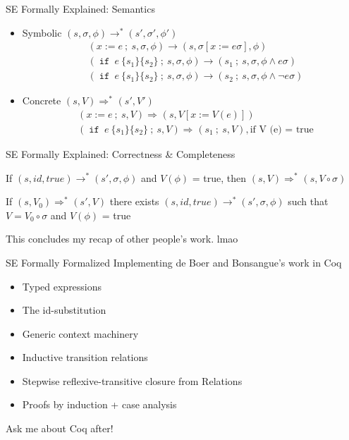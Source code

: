\documentclass{beamer}
\renewcommand{\note}[1]{{\color{orange}#1}}
\DeclareMathOperator{\ifs}{\mathtt{if}}
\begin{document}
\newcommand{\Sstep}[2]{\ensuremath{#1 \rightarrow #2}}
\newcommand{\Sstar}[2]{\ensuremath{#1 \rightarrow^{*} #2}}
\newcommand{\Cstep}[3][]{\ensuremath{#2 \bm{\Rightarrow}_{#1} #3}}
\newcommand{\Cstar}[3][]{\ensuremath{#2 \bm{\Rightarrow^{*}}_{#1} #3}}

\begin{frame}{SE Formally Explained: Semantics}
  \begin{itemize}
    \item Symbolic $\Sstar{(s, \sigma, \phi)}{(s', \sigma', \phi')}$
          \begin{align*}
            &\Sstep{(x := e~;~s, \sigma, \phi)}{(s, \sigma[x := e\sigma], \phi)}\\
            &\Sstep{(\ifs~e~\{s_{1}\}\{s_{2}\}~;~s, \sigma, \phi)}{(s_{1}~;~s, \sigma, \phi \land e\sigma)}\\
            &\Sstep{(\ifs~e~\{s_{1}\}\{s_{2}\}~;~s, \sigma, \phi)}{(s_{2}~;~s, \sigma, \phi \land \neg e\sigma)}
          \end{align*}
    \item Concrete $\Cstar{(s, V)}{(s', V')}$
          \begin{align*}
            &\Cstep{(x := e~;~s, V)}{(s, V[x := V(e)])}\\
            &\Cstep{(\ifs~e~\{s_{1}\}\{s_{2}\}~;~s, V)}{(s_{1}~;~s, V)}, \text{if V (e) = true}
          \end{align*}
  \end{itemize}
\end{frame}

\begin{frame}{SE Formally Explained: Correctness \& Completeness}
  \begin{theorem}[Correctness]
    If $\Sstar{(s, id, true)}{(s', \sigma, \phi)}$ and $V(\phi)$ = true, then $\Cstar{(s, V)}{(s, V \circ \sigma)}$
  \end{theorem}
  \vfill
  \begin{theorem}[Completeness]
    If $\Cstar{(s, V_{0})}{(s', V)}$ there exists $\Sstar{(s, id, true)}{(s', \sigma, \phi)}$ such that $V = V_{0} \circ \sigma$ and $V(\phi)$ = true
  \end{theorem}
  \note{This concludes my recap of other people's work. lmao}
\end{frame}

\begin{frame}{SE Formally Formalized}
  Implementing de Boer and Bonsangue's work in Coq
  \begin{itemize}
    \item Typed expressions
    \item The id-substitution
    \item Generic context machinery
    \item Inductive transition relations
    \item Stepwise reflexive-transitive closure from Relations
    \item Proofs by induction + case analysis
  \end{itemize}

  Ask me about Coq after!
\end{frame}
\end{document}
